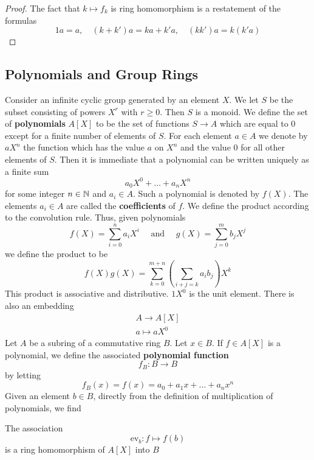 \documentclass[11pt]{article}
\def \ev {\text{ev}}
\begin{document}
\begin{proof}
The fact that \(k\mapsto f_k\) is ring homomorphism is a restatement of the formulas
\begin{equation*}
1a=a,\quad (k+k')a=ka+k'a,\quad (kk')a=k(k'a)
\end{equation*}
\end{proof}


\subsection{Polynomials and Group Rings}
\label{sec:org6f29615}
Consider an infinite cyclic group generated by an element \(X\). We let \(S\) be the subset
consisting of powers \(X^r\) with \(r\ge 0\). Then \(S\) is a monoid. We define the set of
\textbf{polynomials} \(A[X]\) to be the set of functions \(S\to A\) which are equal to 0 except for a finite
number  of elements of \(S\). For each element \(a\in A\) we denote by \(aX^n\) the function which
has the value \(a\) on \(X^n\) and the value 0 for all other elements of \(S\). Then it is
immediate that a polynomial can be written uniquely as a finite sum
\begin{equation*}
a_0X^0+\dots+a_nX^n
\end{equation*}
for some integer \(n\in\mathbb{N}\) and  \(a_i\in A\). Such a polynomial is denoted by \(f(X)\). The
elements \(a_i\in A\) are called the \textbf{coefficients} of \(f\). We define the product according to the
convolution rule. Thus, given polynomials
\begin{equation*}
f(X)=\sum_{i=0}^na_iX^i \quad\text{ and }\quad g(X)=\sum_{j=0}^mb_jX^j
\end{equation*}
we define the product to be
\begin{equation*}
f(X)g(X)=\sum_{k=0}^{m+n}\left( \sum_{i+j=k}a_ib_j \right)X^k
\end{equation*}
This product is associative and distributive. \(1X^0\) is the unit element.  There is also an
embedding
\begin{gather*}
A\to A[X]\\
a\mapsto aX^0
\end{gather*}
Let \(A\) be a subring of a commutative ring \(B\). Let \(x\in B\). If \(f\in A[X]\) is a polynomial,
we define the associated \textbf{polynomial function}
\begin{equation*}
f_B:B\to B
\end{equation*}
by letting
\begin{equation*}
f_B(x)=f(x)=a_0+a_1x+\dots+a_nx^n
\end{equation*}
Given an element \(b\in B\), directly from the definition of multiplication of polynomials, we find
\begin{proposition}[]
The association
\begin{equation*}
\ev_b:f\mapsto f(b)
\end{equation*}
is a ring homomorphism of \(A[X]\) into \(B\)
\end{proposition}
\end{document}
